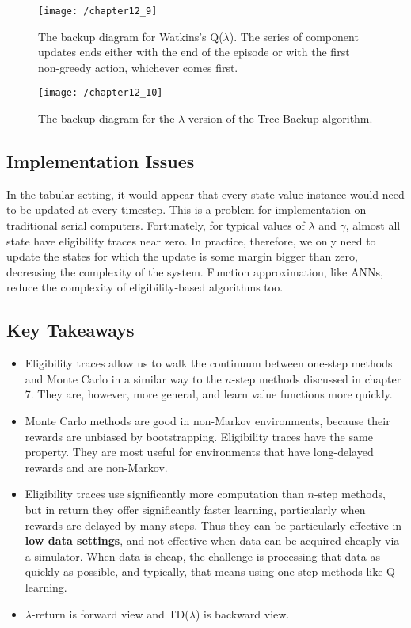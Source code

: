 \begin{figure}
	\centering
	\texttt{[image: /chapter12\_9]}
	\caption{The backup diagram for Watkins’s Q($\lambda$). The series of component updates ends either with the end of the episode or with the first non-greedy action, whichever comes first.}
	\label{fig: 12_9}
\end{figure}

\begin{figure}
	\centering
	\texttt{[image: /chapter12\_10]}
	\caption{The backup diagram for the $\lambda$ version of the Tree Backup algorithm.}
	\label{fig: 12_10}
\end{figure}

\subsection{Implementation Issues}
In the tabular setting, it would appear that every state-value instance would need to be updated at every timestep. This is a problem for implementation on traditional serial computers. Fortunately, for typical values of $\lambda$ and $\gamma$, almost all state have eligibility traces near zero. In practice, therefore, we only need to update the states for which the update is some margin bigger than zero, decreasing the complexity of the system. Function approximation, like ANNs, reduce the complexity of eligibility-based algorithms too.

\subsection{Key Takeaways}
\begin{itemize}
\item Eligibility traces allow us to walk the continuum between one-step methods and Monte Carlo in a similar way to the $n$-step methods discussed in chapter 7. They are, however, more general, and learn value functions more quickly.
\item Monte Carlo methods are good in non-Markov environments, because their rewards are unbiased by bootstrapping. Eligibility traces have the same property. They are most useful for environments that have long-delayed rewards and are non-Markov.
\item Eligibility traces use significantly more computation than $n$-step methods, but in return they offer significantly faster learning, particularly when rewards are delayed by many steps. Thus they can be particularly effective in \textbf{low data settings}, and not effective when data can be acquired cheaply via a simulator. When data is cheap, the challenge is processing that data as quickly as possible, and typically, that means using one-step methods like Q-learning.
\item $\lambda$-return is forward view and TD($\lambda$) is backward view.
\end{itemize}


